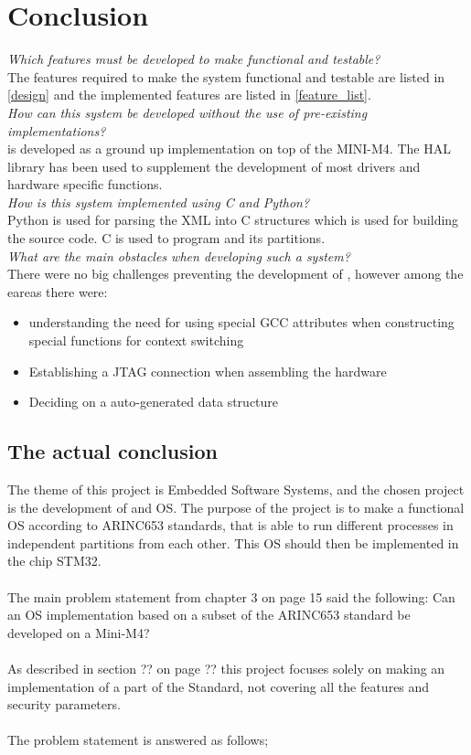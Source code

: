 \chapter{Conclusion}
\textit{Which features must be developed to make \OSname{} functional and
testable?}\\
The features required to make the system functional and testable are listed in \ref{design}
and the implemented features are listed in \ref{feature_list}.\\

\textit{How can this system be developed without the use of pre-existing
implementations?}\\
\OSname{} is developed as a ground up implementation on top of the MINI-M4.
The HAL library has been used to supplement the development of most drivers and hardware specific functions.\\

\textit{How is this system implemented using C and Python?}\\
Python is used for parsing the XML into C structures which is used for building the source code.
C is used to program \OSname{} and its partitions.\\

\textit{What are the main obstacles when developing such a system?}\\
There were no big challenges preventing the development of \OSname{},
however among the eareas  there were:
\begin{itemize}
	\item understanding the need for using special GCC attributes when constructing special functions for context switching
	\item Establishing a JTAG connection when assembling the hardware
	\item Deciding on a auto-generated data structure
\end{itemize}

\section{The actual conclusion}
The theme of this project is Embedded Software Systems, and the chosen project is the development of and
OS. The purpose of the project is to make a functional OS according to ARINC653 standards, that is able to
run different processes in independent partitions from each other. This OS should then be implemented in
the chip STM32.\\
\\
The main problem statement from chapter 3 on page 15 said the following: Can an OS implementation based on
a subset of the ARINC653 standard be developed on a Mini-M4?\\
\\
As described in section ?? on page ?? this project focuses solely on making an
implementation of a part of the Standard, not covering all the features and security parameters.\\
\\
The problem statement is answered as follows;\\

